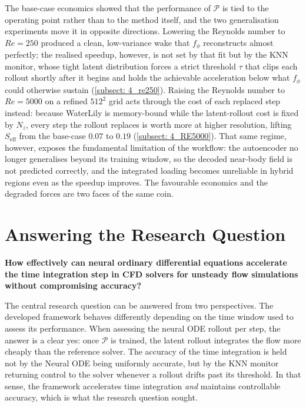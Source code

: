 The base-case economics showed that the performance of $\mathcal{P}$ is tied to the operating point rather than to the method itself, and the two generalisation experiments move it in opposite directions. Lowering the Reynolds number to $Re=250$ produced a clean, low-variance wake that $f_\phi$ reconstructs almost perfectly; the realised speedup, however, is not set by that fit but by the KNN monitor, whose tight latent distribution forces a strict threshold $\tau$ that clips each rollout shortly after it begins and holds the achievable acceleration below what $f_\phi$ could otherwise sustain (\autoref{subsect: 4_re250}). Raising the Reynolds number to $Re=5000$ on a refined $512^2$ grid acts through the cost of each replaced step instead: because WaterLily is memory-bound while the latent-rollout cost is fixed by $N_z$, every step the rollout replaces is worth more at higher resolution, lifting $S_\text{eff}$ from the base-case $0.07$ to $0.19$ (\autoref{subsect: 4_RE5000}). That same regime, however, exposes the fundamental limitation of the workflow: the autoencoder no longer generalises beyond its training window, so the decoded near-body field is not predicted correctly, and the integrated loading becomes unreliable in hybrid regions even as the speedup improves. The favourable economics and the degraded forces are two faces of the same coin. 


\section{Answering the Research Question}
\label{sect: conclusion_rq}

\noindent\textbf{How effectively can neural ordinary differential equations accelerate the time integration step in CFD solvers for unsteady flow simulations without compromising accuracy?}

The central research question can be answered from two perspectives. The developed framework behaves differently depending on the time window used to assess its performance. When assessing the neural ODE rollout per step, the answer is a clear yes: once $\mathcal{P}$ is trained, the latent rollout integrates the flow more cheaply than the reference solver. The accuracy of the time integration is held not by the Neural ODE being uniformly accurate, but by the KNN monitor returning control to the solver whenever a rollout drifts past its threshold. In that sense,  the framework accelerates time integration \emph{and} maintains controllable accuracy, which is what the research question sought.

